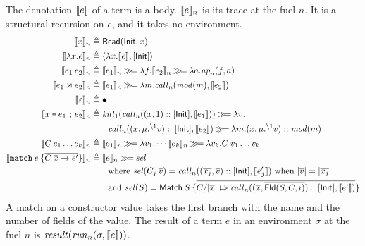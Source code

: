 The denotation $\llbracket{e}\rrbracket$ of a term is a body.
$\llbracket{e}\rrbracket_{n}$ is its trace at the fuel $n$.
It is a structural recursion on $e$, and it takes no environment.
\begin{alignat*}{2}
  \den{x}{n}                      & \triangleq\ReadE(\InitE,x)                                                                                    \\
  \den{\lambda x.e}{n}            & \triangleq\langle\lambda x.\sembracket{e},[\InitE]\rangle                                                      \\
  \den{e_1\:e_2}{n}               & \triangleq\den{e_1}{n}\bindt\lambda f.\den{e_2}{n}\bindt\lambda a.\apf{n}(f,a)                                 \\
  \den{e_1\synlink e_2}{n}        & \triangleq\den{e_1}{n}\bindt\lambda m.\callt{n}(\modf(m),\sembracket{e_2})                                     \\
  \den{\varepsilon}{n}            & \triangleq\bullet                                                                                             \\
  \den{\synbind{x}{e_1}{e_2}}{n}  & \triangleq\killf{1}(\callt{n}((x,1)\cons[\InitE],\sembracket{e_1}))\bindt\lambda v.                              \\
                                  & \qquad\callt{n}((x,\muval{\closeloc{1}{v}})\cons[\InitE],\sembracket{e_2})\bindt\lambda m.(x,\muval{\closeloc{1}{v}})\cons\modf(m) \\
  \den{C\:e_1\dots e_k}{n}        & \triangleq\den{e_1}{n}\bindt\lambda v_1.\cdots\den{e_k}{n}\bindt\lambda v_k.C\:v_1\dots v_k                   \\
  \den{\texttt{match}\:e\:\{\overline{C\:\overline{x}\rightarrow e'}\}}{n} & \triangleq\den{e}{n}\bindt\mathit{sel}                         \\
                                  & \qquad\text{where }\mathit{sel}(C_j\:\overline{v})=\callt{n}((\overline{x_j},\overline{v})\cons[\InitE],\sembracket{e_j'})\text{ when }|\overline{v}|=|\overline{x_j}| \\
                                  & \qquad\text{and }\mathit{sel}(S)=\MatchT\:S\:\{\overline{C/|\overline{x}|\Mapsto\callt{n}((\overline{x},\overline{\FldE(S,C,i)})\cons[\InitE],\sembracket{e'})}\}
\end{alignat*}
A match on a constructor value takes the first branch with the name and the number of fields of the value.
The result of a term $e$ in an environment $\sigma$ at the fuel $n$ is $\mathit{result}(\mathit{run}_{n}(\sigma,\llbracket{e}\rrbracket))$.

